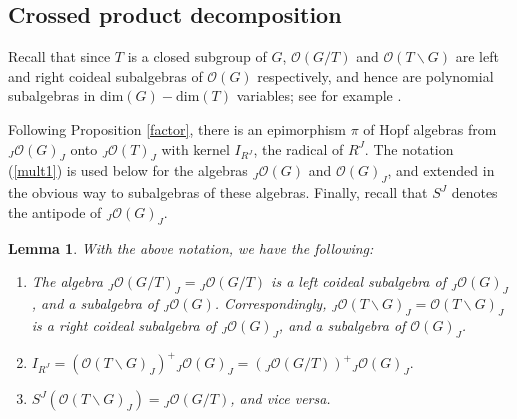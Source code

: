 \documentclass{amsart}
\numberwithin{equation}{section}
\newtheorem{lemma}[theorem]{Lemma}
\theoremstyle{definition}
\begin{document}
\subsection{Crossed product decomposition}\label{crossedsec}  Recall that since $T$ is a closed subgroup of $G$, $\mathcal{O}(G/T)$ and $\mathcal{O}(T\backslash G)$ are left and right coideal subalgebras of $\mathcal{O}(G)$ respectively, and hence are polynomial subalgebras in $\mathrm{dim}(G) - \mathrm{dim}(T)$ variables; see for example \cite{BG}.

Following Proposition \ref{factor}, there is an epimorphism $\pi$ of Hopf algebras from ${}_J\mathcal{O}(G)_J$ onto ${}_J\mathcal{O}(T)_J$ with kernel $I_{R^J}$, the radical of $R^J$. The notation (\ref{mult1}) is used below for the algebras ${}_J\mathcal{O}(G)$ and $\mathcal{O}(G)_J$, and extended in the obvious way to subalgebras of these algebras.
 Finally, recall that $S^J$ denotes the antipode of ${}_J \mathcal{O}(G)_J$.
 
\begin{lemma}\label{basics} 
With the above notation, we have the following:
\begin{enumerate}
\item The algebra ${}_J\mathcal{O}(G/T)_J={}_J\mathcal{O}(G/T)$ is a left coideal subalgebra of $_J\mathcal{O}(G)_J$, and a subalgebra of ${}_J\mathcal{O}(G)$. Correspondingly, $_J\mathcal{O}(T\backslash G)_J =\mathcal{O}(T\backslash G)_J$ is a right coideal subalgebra of ${}_J\mathcal{O}(G)_J$, and a subalgebra of $\mathcal{O}(G)_J$.
\item $I_{R^J}=(\mathcal{O}(T\backslash G)_J)^+ {}_J\mathcal{O}(G)_J=({}_J\mathcal{O}(G/T))^+ {}_J\mathcal{O}(G)_J.$
\item $S^J(\mathcal{O}(T\backslash G)_J)={}_J\mathcal{O}(G/T)$, and vice versa.
\end{enumerate}
\end{lemma}
\end{document}
